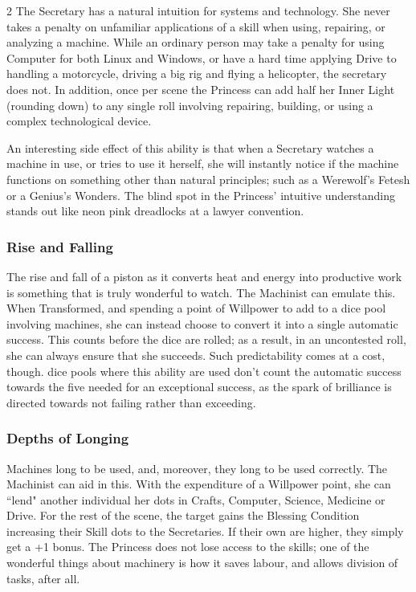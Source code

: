 \begin{multicols}{2}
The Secretary has a natural intuition for systems and technology. She never takes a penalty on unfamiliar applications of a skill when using, repairing, or analyzing a machine. While an ordinary person may take a penalty for using Computer for both Linux and Windows, or have a hard time applying Drive to handling a motorcycle, driving a big rig and flying a helicopter, the secretary does not. In addition, once per scene the Princess can add half her Inner Light (rounding down) to any single roll involving repairing, building, or using a complex technological device.

An interesting side effect of this ability is that when a Secretary watches a machine in use, or tries to use it herself, she will instantly notice if the machine functions on something other than natural principles; such as a Werewolf’s Fetesh or a Genius’s Wonders. The blind spot in the Princess' intuitive understanding stands out like neon pink dreadlocks at a lawyer convention. 

\subsubsection*{Rise and Falling}

The rise and fall of a piston as it converts heat and energy into productive work is something that is truly wonderful to watch. The Machinist can emulate this. When Transformed, and spending a point of Willpower to add to a dice pool involving machines, she can instead choose to convert it into a single automatic success. This counts before the dice are rolled; as a result, in an uncontested roll, she can always ensure that she succeeds. Such predictability comes at a cost, though. dice pools where this ability are used don't count the automatic success towards the five needed for an exceptional success, as the spark of brilliance is directed towards not failing rather than exceeding. 

\subsubsection*{Depths of Longing}
Machines long to be used, and, moreover, they long to be used correctly. The Machinist can aid in this. With the expenditure of a Willpower point, she can \textquotedblleft lend" another individual her dots in Crafts, Computer, Science, Medicine or Drive. For the rest of the scene, the target gains the Blessing Condition increasing their Skill dots to the Secretaries. If their own are higher, they simply get a +1 bonus. The Princess does not lose access to the skills; one of the wonderful things about machinery is how it saves labour, and allows division of tasks, after all. 

\end{multicols}
